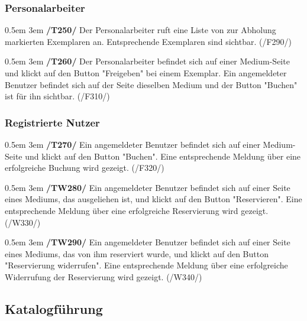 \documentclass{article}
\newcommand{\specification}[3]{
	{\parindent 0.5em \hangindent 3em \hypertarget{spec:#1:#2}{\textbf{/#1#2/}} #3 \par \nobreak \vspace*{0.5em}}
}
\begin{document}
		\subsubsection{Personalarbeiter}
			\specification{T}{250}{Der Personalarbeiter ruft eine Liste von zur Abholung markierten Exemplaren an. Entsprechende Exemplaren sind sichtbar. (/F290/)}
			\specification{T}{260}{Der Personalarbeiter befindet sich auf einer Medium-Seite und klickt auf den Button "Freigeben" bei einem Exemplar. 
				Ein angemeldeter Benutzer befindet sich auf der Seite dieselben Medium und der Button "Buchen" ist für ihn sichtbar. (/F310/)}
		\subsubsection{Registrierte Nutzer}
			\specification{T}{270}{Ein angemeldeter Benutzer befindet sich auf einer Medium-Seite und klickt auf den Button "Buchen". Eine entsprechende Meldung über eine erfolgreiche Buchung wird gezeigt. (/F320/) }
			\specification{TW}{280}{Ein angemeldeter Benutzer befindet sich auf einer Seite eines Mediums, das ausgeliehen ist, und klickt auf den Button "Reservieren". 
				Eine entsprechende Meldung über eine erfolgreiche Reservierung wird gezeigt. (/W330/) }
			\specification{TW}{290}{Ein angemeldeter Benutzer befindet sich auf einer Seite eines Mediums, das von ihm reserviert wurde, und klickt auf den Button "Reservierung widerrufen". 
				Eine entsprechende Meldung über eine erfolgreiche Widerrufung der Reservierung wird gezeigt. (/W340/) }
\subsection{Katalogführung}
\end{document}

